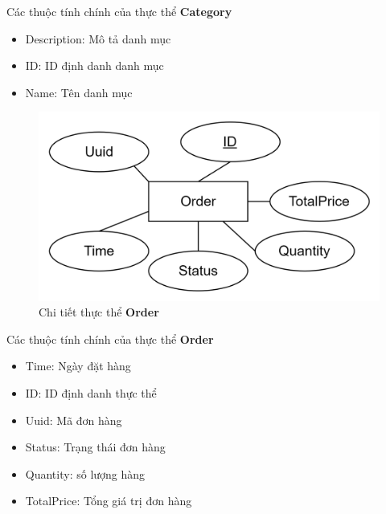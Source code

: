 \newpage
Các thuộc tính chính của thực thể \textbf{Category}
\begin{itemize}
    \item Description: Mô tả danh mục
    \item ID: ID định danh danh mục
    \item Name: Tên danh mục
\end{itemize}

\begin{figure}[h]
    \centering
    \includegraphics[scale = 0.20]{img/db/order.png}
    \vspace{1cm}
    \caption{Chi tiết thực thể \textbf{Order}}
    \label{fig:taskAssignment}
\end{figure}
Các thuộc tính chính của thực thể \textbf{Order}
\begin{itemize}
    \item Time: Ngày đặt hàng
    \item ID: ID định danh thực thể
    \item Uuid: Mã đơn hàng
    \item Status: Trạng thái đơn hàng
    \item Quantity: số lượng hàng
    \item TotalPrice: Tổng giá trị đơn hàng
\end{itemize}

